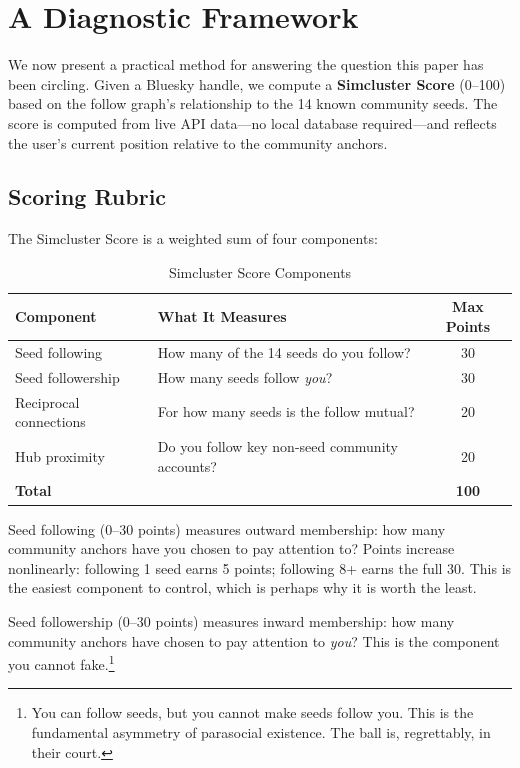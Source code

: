 \documentclass[11pt,a4paper]{article}
\begin{document}
\section{A Diagnostic Framework}
\label{sec:diagnostic}

We now present a practical method for answering the question this paper has been circling. Given a Bluesky handle, we compute a \textbf{Simcluster Score} (0--100) based on the follow graph's relationship to the 14 known community seeds. The score is computed from live API data---no local database required---and reflects the user's current position relative to the community anchors.

\subsection{Scoring Rubric}

The Simcluster Score is a weighted sum of four components:

\begin{table}[H]
\centering
\caption{Simcluster Score Components}
\label{tab:score}
\begin{tabular}{llc}
    \toprule
    Component & What It Measures & Max Points \\
    \midrule
    Seed following & How many of the 14 seeds do you follow? & 30 \\
    Seed followership & How many seeds follow \textit{you}? & 30 \\
    Reciprocal connections & For how many seeds is the follow mutual? & 20 \\
    Hub proximity & Do you follow key non-seed community accounts? & 20 \\
    \midrule
    \textbf{Total} & & \textbf{100} \\
    \bottomrule
\end{tabular}
\end{table}

Seed following (0--30 points) measures outward membership: how many community anchors have you chosen to pay attention to? Points increase nonlinearly: following 1 seed earns 5 points; following 8+ earns the full 30. This is the easiest component to control, which is perhaps why it is worth the least.

Seed followership (0--30 points) measures inward membership: how many community anchors have chosen to pay attention to \textit{you}? This is the component you cannot fake.\footnote{You can follow seeds, but you cannot make seeds follow you. This is the fundamental asymmetry of parasocial existence. The ball is, regrettably, in their court.}
\end{document}
